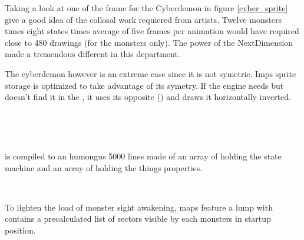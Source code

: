 \par
Taking a look at one of the frame for the Cyberdemon in figure \ref{cyber_sprite} give a good idea of the collosal work requiered from artists. Twelve monsters times eight states times average of five frames per animation would have required close to 480 drawings (for the monsters only). The power of the NextDimension made a tremendous different in this department.\\
\par
The cyberdemon however is an extreme case since it is not symetric. Imps sprite storage is optimized to take advantage of its symetry. If the engine needs  but doesn't find it in the , it uses its opposite () and draws it horizontally inverted. 
\par
{}




\begin{figure}[H] \centering
{}
\end{figure}
\par
{}\\
\par 
{}\\
\par





 is compiled to an humongus 5000 lines  made of an array of  holding the state machine and an array of  holding the things properties.\\
\par
{}\\
\par
To lighten the load of monster sight awakening, maps feature a  lump with contains a precalculated list of sectors visible by each monsters in startup position.\\
\par
{}
\pagebreak






